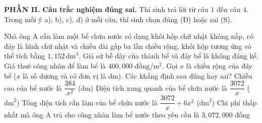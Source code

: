 \noindent\textbf{PHẦN II. Câu trắc nghiệm đúng sai.} Thí sinh trả lời từ câu $1$ đến câu $4$. Trong mỗi ý a), b), c), d) ở mỗi câu, thí sinh chọn đúng (Đ) hoặc sai (S).
\setcounter{ex}{0}
\begin{ex} %
	Nhà ông A cần làm một bể chứa nước có dạng khối hộp chữ nhật không nắp, có đáy là hình chữ nhật và chiều dài gấp ba lần chiều rộng, khối hộp tương ứng có thể tích bằng $1{,}152$\,$\text{dm}^3$. Giả sử bề dày của thành bể và đáy bể là không đáng kể. Giá thuê công nhân để làm bể là $400{,}000$ đồng/m$^2$. Gọi $x$ là chiều rộng của đáy bể ($x$ là số dương và có đơn vị là dm). Các khẳng định sau đúng hay sai?
	\choiceTF
	{\True Chiều cao của bể nước là $\dfrac{384}{x^2}$ (dm)}
	{\True Diện tích xung quanh của bể chứa nước là $\dfrac{3072}{x}$ ($\text{dm}^2$)}
	{Tổng diện tích cần làm của bể chứa nước là $\dfrac{3072}{x}+6x^2$ ($\text{dm}^2$)}
	{Chi phí thấp nhất mà ông A trả cho công nhân làm bể nước theo yêu cầu là $3{,}072{,}000$ đồng}
\end{ex}

